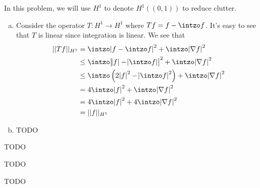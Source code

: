 \documentclass{article}
\newcommand{\D}{\nabla}
\begin{document}
\newpage
{} 
 \tri
\hop 
\solution
In this problem, we will use $H^1$ to denote $H^1((0,1))$ to reduce clutter.
\begin{enumerate}[(a)]
    \item Consider the operator $T: H^1 \to H^1$ where $Tf = f - \intzo f$. It's easy to see that $T$ is linear since integration is linear. We see that 
    \begin{align}
        ||Tf||_{H^1} &= \intzo \abs{f - \intzo f}^2 + \intzo \abs{\D f}^2 \\
        &\le  \intzo \abs{\abs{f} - \abs{\intzo f}}^2 + \intzo \abs{\D f} ^2\\
        &\le  \intzo \del{2\abs{f}^2 - \abs{\intzo f}^2} + \intzo \abs{\D f}^2 \\
        &=  4\intzo \abs{f}^2 + \intzo \abs{\D f}^2 \\
        &=  4\intzo \abs{f}^2 + 4\intzo \abs{\D f}^2 \\
        &= ||f||_{H^1}
    \end{align}
    \item TODO
\end{enumerate}

\newpage
{} 
 \tri
\hop 
\solution
TODO

\newpage
{} 
 \tri
\hop 
\solution
TODO

\newpage
{} 
 \tri
\hop 
\solution
TODO
\end{document}
